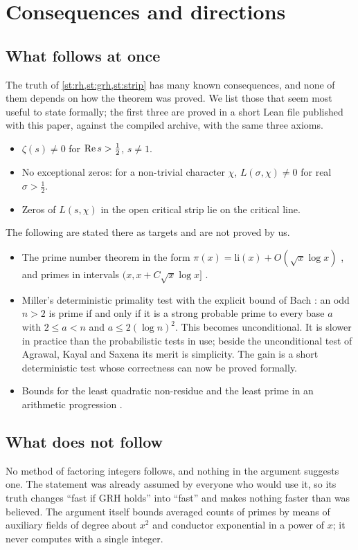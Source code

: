 \section{Consequences and directions}\label{sec:directions}

\subsection{What follows at once}
The truth of \cref{st:rh,st:grh,st:strip} has many known consequences, and none of them depends
on how the theorem was proved. We list those that seem most useful to state formally; the
first three are proved in a short Lean file published with this paper, against the compiled
archive, with the same three axioms.
\begin{itemize}
\item $\zeta(s)\ne0$ for $\operatorname{Re} s>\tfrac12$, $s\neq1$.
\item No exceptional zeros: for a non-trivial character $\chi$, $L(\sigma,\chi)\neq0$ for real
  $\sigma>\tfrac12$.
\item Zeros of $L(s,\chi)$ in the open critical strip lie on the critical line.
\end{itemize}
The following are stated there as targets and are not proved by us.
\begin{itemize}
\item The prime number theorem in the form $\pi(x)=\mathrm{li}(x)+O(\sqrt x\log x)$
  \cite{vonkoch1901}, and primes in intervals $(x,x+C\sqrt x\log x]$ \cite{cramer1920}.
\item Miller's deterministic primality test \cite{miller1976} with the explicit bound of Bach
  \cite{bach1990}: an odd $n>2$ is prime if and only if it is a strong probable prime to every
  base $a$ with $2\le a<n$ and $a\le2(\log n)^2$. This becomes unconditional. It is slower in practice than the
  probabilistic tests in use; beside the unconditional test of Agrawal, Kayal and Saxena
  \cite{aks2004} its merit is simplicity. The gain is a short deterministic test whose
  correctness can now be proved formally.
\item Bounds for the least quadratic non-residue \cite{ankeny1952} and the least prime in an
  arithmetic progression \cite{bachsorenson1996}.
\end{itemize}

\subsection{What does not follow}
No method of factoring integers follows, and nothing in the argument suggests one. The
statement was already assumed by everyone who would use it, so its truth changes
``fast if GRH holds'' into ``fast'' and makes nothing faster than was believed. The argument
itself bounds averaged counts of primes by means of auxiliary fields of degree about $x^2$ and
conductor exponential in a power of $x$; it never computes with a single integer.

